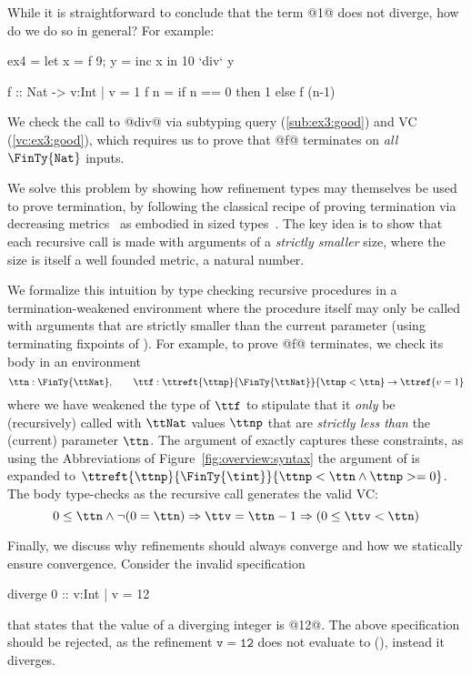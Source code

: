 %
While it is straightforward to conclude that the term @1@ 
does not diverge, how do we do so in general?
%
For example:
%
\begin{code}
  ex4 = let {x = f 9; y = inc x} in 10 `div` y
  
  f   :: Nat -> {v:Int | v = 1}
  f n = if n == 0 then 1 else f (n-1)
\end{code}
%
We check the call to @div@ via subtyping query (\ref{sub:ex3:good}) and 
VC (\ref{vc:ex3:good}), which requires us to prove that @f@ terminates on
\emph{all} $\FinTy{\mathtt{Nat}}$ inputs.

We solve this problem by showing how
refinement types may themselves be 
used to prove termination, by following
the classical recipe of proving termination 
via decreasing metrics~\cite{Turing36}
as embodied in sized types~\cite{HughesParetoSabry96,XiTerminationLICS01}.
%
The key idea is to show that each 
recursive call is made with arguments 
of a \emph{strictly smaller} size, 
where the size is itself a well 
founded metric, \eg a natural number.

We formalize this intuition by type checking
recursive procedures in a {termination-weakened environment}
where the procedure itself may only be called with arguments 
that are strictly smaller than the current parameter 
(using terminating fixpoints of ).
%
For example, to prove @f@ terminates, we check its body in an environment 
%
$${\ttn} : {\FinTy{\ttNat}}, \qquad {\ttf} : {\ttreft{\ttnp}{\FinTy{\ttNat}}{\ttnp < \ttn} \rightarrow \ttref{v=1}}$$
%
where we have weakened the type of $\ttf$ to stipulate that it 
\emph{only} be (recursively) called with $\ttNat$ values $\ttnp$ that are 
\emph{strictly less than} the (current) parameter $\ttn$. 
The argument of \ttf exactly captures these constraints, 
as using the Abbreviations of Figure~\ref{fig:overview:syntax}
the argument of \ttf is expanded to 
$\ttreft{\ttnp}{\FinTy{\tint}}{\ttnp < \ttn \land \ttnp >= 0}$.
The body
type-checks as the recursive call generates the valid VC:
%
$$0 \leq \ttn \wedge \lnot (0 = \ttn)  \Rightarrow \ttv = \ttn - 1 \Rightarrow (0 \leq \ttv < \ttn)$$

Finally, we discuss why refinements should always converge
and how we statically ensure convergence.
%
Consider the invalid specification
\begin{code}
  diverge 0 :: {v:Int | v = 12}
\end{code}
that states that the value of a diverging integer is @12@.
%
The above specification should be rejected, 
as the refinement $\mathtt{v = 12}$ does not evaluate to \etrue 
(),
instead it diverges.

